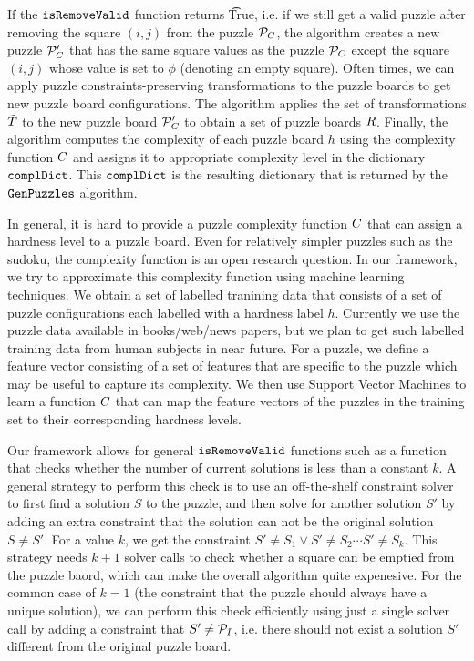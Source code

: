 If the $\texttt{isRemoveValid}$ function returns \t{True}, i.e. if we still
get a valid puzzle after removing the square $(i,j)$ from the puzzle
$\mathcal{P}_C$, the algorithm creates a new puzzle $\mathcal{P}_C'$
that has the same square values as the puzzle $\mathcal{P}_C$ except
the square $(i,j)$ whose value is set to $\phi$ (denoting an empty
square). Often times, we can apply puzzle constraints-preserving
transformations to the puzzle boards to get new puzzle board
configurations. The algorithm applies the set of transformations
$\tilde{T}$ to the new puzzle board $\mathcal{P}_C'$ to
obtain a set of puzzle boards $R$. Finally, the algorithm
computes the complexity of each puzzle board $h$ using the complexity
function $C$ and assigns it to appropriate complexity
level in the dictionary $\texttt{complDict}$. This $\texttt{complDict}$ is
the resulting dictionary that is returned by the $\texttt{GenPuzzles}$
algorithm.

In general, it is hard to provide a puzzle complexity function
$C$ that can assign a hardness level to a puzzle
board. Even for relatively simpler puzzles such as the sudoku, the
complexity function is an open research question. In our framework, we
try to approximate this complexity function using machine learning
techniques. We obtain a set of labelled tranining data that consists
of a set of puzzle configurations each labelled with a hardness label
$h$. Currently we use the puzzle data available in books/web/news
papers, but we plan to get such labelled training data from human
subjects in near future. For a puzzle, we define a feature vector
consisting of a set of features that are specific to the puzzle which
may be useful to capture its complexity. We then use Support Vector
Machines to learn a function $C$ that can map the
feature vectors of the puzzles in the training set to their
corresponding hardness levels.

Our framework allows for general $\texttt{isRemoveValid}$ functions such as a
function that checks whether the number of current solutions is less
than a constant $k$. A general strategy to perform this check is to
use an off-the-shelf constraint solver to first find a solution $S$ to
the puzzle, and then solve for another solution $S'$ by adding an
extra constraint that the solution can not be the original solution $S
\neq S'$. For a value $k$, we get the constraint $S' \neq S_1 \lor S'
\neq S_2 \cdots S' \neq S_k$. This strategy needs $k+1$ solver calls
to check whether a square can be emptied from the puzzle baord, which
can make the overall algorithm quite expenesive. For the common case
of $k=1$ (the constraint that the puzzle should always have a unique
solution), we can perform this check efficiently using just a single
solver call by adding a constraint that $S' \neq \mathcal{P}_I$,
i.e. there should not exist a solution $S'$ different from the
original puzzle board.

